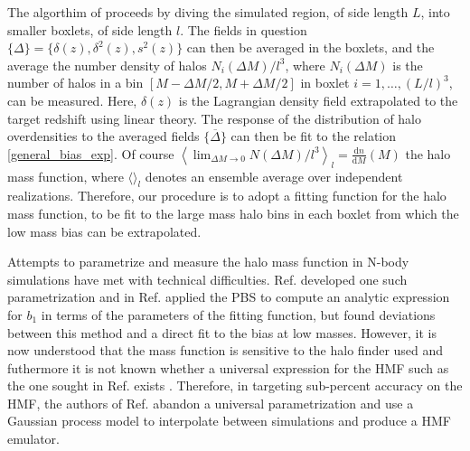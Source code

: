 The algorthim of \citeauthor{modietal2017} proceeds by diving the simulated region, of side length $L$, into smaller boxlets, of side length $l$. The fields in question $\{\Delta\} = \{\delta(z), \delta^2(z), s^2(z)\}$ can then be averaged in the boxlets, and the average the number density of halos $N_i(\Delta M)/l^3$, where $N_i(\Delta M)$ is the number of halos in a bin $[M - \Delta M/2, M + \Delta M/2]$ in boxlet $i = 1, \dots, (L/l)^3$, can be measured. Here, $\delta(z)$ is the Lagrangian density field extrapolated to the target redshift using linear theory. The response of the distribution of halo overdensities to the averaged fields $\{\overline{\Delta}\}$ can then be fit to the relation \ref{general_bias_exp}. Of course $\left\langle \lim_{\Delta M \rightarrow 0} N(\Delta M)/l^3 \right\rangle_l = \frac{\mathrm{d}n}{\mathrm{d}M}(M)$ the halo mass function, where $\langle \rangle_l$ denotes an ensemble average over independent realizations. Therefore, our procedure is to adopt a fitting function for the halo mass function, to be fit to the large mass halo bins in each boxlet from which the low mass bias can be extrapolated.

Attempts to parametrize and measure the halo mass function in N-body simulations have met with technical difficulties. Ref. \citep{tinker2008} developed one such parametrization and in Ref. \citep{tinker2010} applied the PBS to compute an analytic expression for $b_1$ in terms of the parameters of the fitting function, but found deviations between this method and a direct fit to the bias at low masses. However, it is now understood that the mass function is sensitive to the halo finder used and futhermore it is not known whether a universal expression for the HMF such as the one sought in Ref. \citep{tinker2008} exists \citep{desjacquesetal2018}. Therefore, in targeting sub-percent accuracy on the HMF, the authors of Ref. \citep{aemulushmf} abandon a universal parametrization and use a Gaussian process model to interpolate between simulations and produce a HMF emulator.

